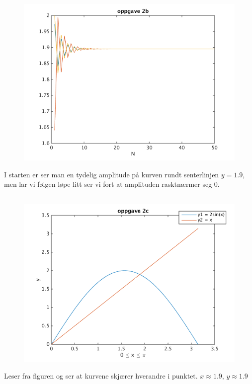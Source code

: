 \documentclass[11pt]{article}
\begin{document}
	\subsection*{}
		\begin{figure}[H]
			\includegraphics[width=13cm]{oppg2b}
		\end{figure}
	\noindent I starten er ser man en tydelig amplitude på kurven rundt senterlinjen $y = 1.9$, men lar vi følgen løpe litt ser vi fort at amplituden rasktnærmer seg 0.
	\subsection*{}
		\begin{figure}[H]
			\includegraphics[width=13cm]{oppg2c}
		\end{figure}
		\noindent Leser fra figuren og ser at kurvene skjærer hverandre i punktet. $x\approx1.9$, $y\approx1.9$
\end{document}

